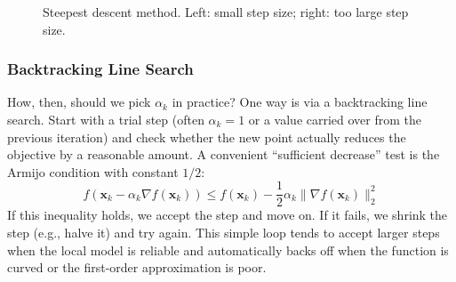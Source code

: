 \begin{figure}[H]
    \caption{Steepest descent method. Left: small step size; right: too large step size.}
    \label{fig:steepest-descent}
\end{figure}

\subsubsection{Backtracking Line Search}
How, then, should we pick $\alpha_k$ in practice? One way is via a backtracking line search. Start with a trial step (often $\alpha_k=1$ or a value carried over from the previous iteration) and check whether the new point actually reduces the objective by a reasonable amount. A convenient ``sufficient decrease'' test is the Armijo condition with constant $1/2$:
\begin{equation}
f\!\left(\mathbf{x}_k-\alpha_k\nabla f(\mathbf{x}_k)\right)\le
f(\mathbf{x}_k)-\frac{1}{2}\alpha_k\|\nabla f(\mathbf{x}_k)\|_2^2
\end{equation}
If this inequality holds, we accept the step and move on. If it fails, we shrink the step (e.g., halve it) and try again. This simple loop tends to accept larger steps when the local model is reliable and automatically backs off when the function is curved or the first-order approximation is poor.

